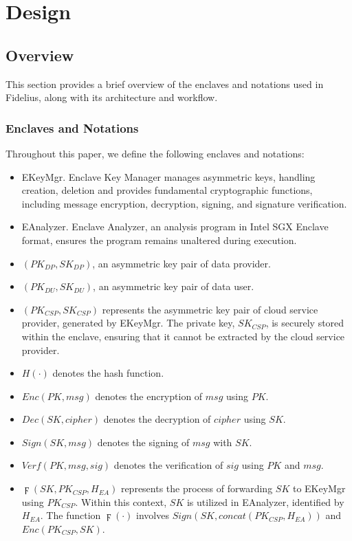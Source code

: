 
\section{Design}\label{sec:design}

\subsection{Overview}
This section provides a brief overview of the enclaves and notations used in Fidelius, along with its architecture and workflow.


\subsubsection{Enclaves and Notations}
Throughout this paper, we define the following enclaves and notations:
\begin{itemize}
    \item EKeyMgr. Enclave Key Manager manages asymmetric keys, handling creation, deletion and provides fundamental cryptographic functions, including message encryption, decryption, signing, and signature verification.
    \item EAnalyzer. Enclave Analyzer, an analysis program in Intel SGX Enclave format, ensures the program remains unaltered during execution.
    \item $(PK_{DP},SK_{DP})$, an asymmetric key pair of data provider.
    \item $(PK_{DU},SK_{DU})$, an asymmetric key pair of data user.
    \item $(PK_{CSP}, SK_{CSP})$ represents the asymmetric key pair of cloud service provider, generated by EKeyMgr. The private key, $SK_{CSP}$, is securely stored within the enclave, ensuring that it cannot be extracted by the cloud service provider.
    \item $H(\cdot)$ denotes the hash function.
    \item $Enc(PK, msg)$ denotes the encryption of $msg$ using $PK$.
    \item $Dec(SK, cipher)$ denotes the decryption of $cipher$ using $SK$.
    \item $Sign(SK, msg)$ denotes the signing of $msg$ with $SK$.
    \item $Verf(PK, msg, sig)$ denotes the verification of $sig$ using $PK$ and $msg$.
    \item $\digamma(SK, PK_{CSP}, H_{EA})$ represents the process of forwarding $SK$ to EKeyMgr using $PK_{CSP}$. Within this context, $SK$ is utilized in EAnalyzer, identified by $H_{EA}$. The function $\digamma(\cdot)$ involves $Sign(SK, concat(PK_{CSP}, H_{EA}))$ and $Enc(PK_{CSP}, SK)$.
\end{itemize}


